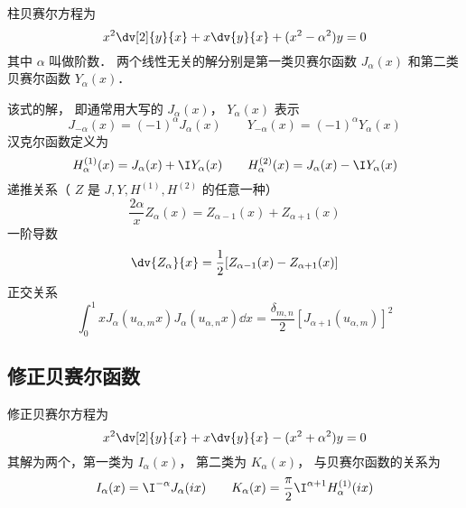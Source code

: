 
柱贝赛尔方程为%
\begin{equation}
x^2 \dv[2]{y}{x} + x\dv{y}{x} + (x^2 - \alpha ^2)y = 0
\end{equation}
其中 $\alpha$ 叫做阶数． 两个线性无关的解分别是第一类贝赛尔函数 $J_\alpha(x)$ 和第二类贝赛尔函数 $Y_\alpha(x)$． 

该式的解， 即通常用大写的 $J_\alpha(x)$， $Y_\alpha(x)$ 表示
\begin{equation}
J_{-\alpha}(x) = (-1)^\alpha J_\alpha(x)
\qquad
Y_{-\alpha}(x) = (-1)^\alpha Y_\alpha(x)
\end{equation}
汉克尔函数定义为
\begin{equation}
H_\alpha ^{(1)}(x) = J_\alpha(x) + \I Y_\alpha(x)
\qquad
H_\alpha ^{(2)}(x) = J_\alpha(x) - \I Y_\alpha(x)
\end{equation} 
递推关系（ $Z$ 是 $J, Y, H^{(1)}, H^{(2)}$ 的任意一种）
\begin{equation}
\frac{2\alpha}{x} Z_\alpha(x) = Z_{\alpha -1}(x) + Z_{\alpha+1}(x)
\end{equation}
一阶导数
\begin{equation}
\dv{Z_\alpha}{x} = \frac12 [Z_{\alpha  - 1}(x) - Z_{\alpha +1}(x)]
\end{equation}
正交关系
\begin{equation}
\int_0^1 x J_\alpha (u_{\alpha ,m} x) J_\alpha (u_{\alpha ,n} x) \dd{x} = \frac{\delta_{m,n}}{2}[J_{\alpha + 1} (u_{\alpha ,m})]^2
\end{equation}

\subsection{修正贝赛尔函数}
修正贝赛尔方程为
\begin{equation}
x^2 \dv[2]{y}{x} + x \dv{y}{x} - (x^2 + \alpha ^2)y = 0
\end{equation}
其解为两个，第一类为 $I_\alpha(x)$，  第二类为 $K_\alpha(x)$，  与贝赛尔函数的关系为
\begin{equation}
I_\alpha(x) = \I^{-\alpha} J_\alpha(ix)
\qquad
K_\alpha(x) = \frac{\pi}{2} \I^{\alpha  + 1} H_\alpha ^{(1)}(ix)
\end{equation}

